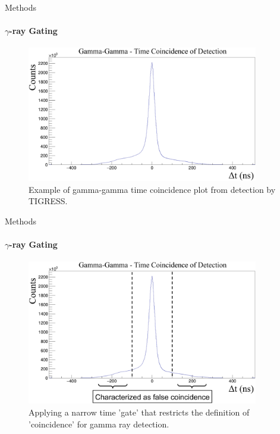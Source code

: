 \documentclass{beamer}
\begin{document}
\begin{frame}{Methods}
\framesubtitle{$\gamma$-ray Gating}
\begin{figure}[!hht]
  \centering
  \includegraphics[width=0.9\textwidth, keepaspectratio]{GG_Gate1.png}
  \caption{Example of gamma-gamma time coincidence plot from detection by TIGRESS.}
  \label{yyHist}
\end{figure}
\end{frame}



\begin{frame}{Methods}
\framesubtitle{$\gamma$-ray Gating}
\begin{figure}[!hht]
  \centering
  \includegraphics[width=0.9\textwidth, keepaspectratio]{GG_Gate2.png}
  \caption{Applying a narrow time 'gate' that restricts the definition of 'coincidence' for gamma ray detection.}
  \label{yyHist}
\end{figure}
\end{frame}

\end{document}
